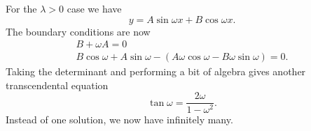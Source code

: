 \begin{exm}
    For the $\lambda >0$ case we have
    \begin{equation}
        y=A\sin\omega x + B \cos\omega x.
    \end{equation}
    The boundary conditions are now
    \begin{gather}
        B + \omega A  =0\\
        B\cos\omega + A \sin\omega -(A\omega \cos\omega - B \omega \sin \omega)=0.
    \end{gather}
    Taking the determinant and performing a bit of algebra gives another transcendental equation
    \begin{equation}
        \tan \omega =\frac{2\omega}{1-\omega^2}.
    \end{equation}
    Instead of one solution, we now have infinitely many.
\end{exm}